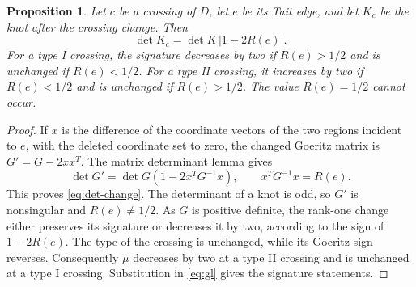 \documentclass[10pt,a4paper]{amsart}
\newtheorem{proposition}{Proposition}
\newcommand{\Reff}{R}
\begin{document}
\begin{proposition}\label{prop:sigma}
Let $c$ be a crossing of $D$, let $e$ be its Tait edge, and let $K_c$ be the knot after
the crossing change. Then
\begin{equation}\label{eq:det-change}
    \det K_c=\det K\,|1-2\Reff(e)|.
\end{equation}
For a type I crossing, the signature decreases by two if $\Reff(e)>1/2$ and is unchanged
if $\Reff(e)<1/2$. For a type II crossing, it increases by two if $\Reff(e)<1/2$ and
is unchanged if $\Reff(e)>1/2$. The value $\Reff(e)=1/2$ cannot occur.
\end{proposition}

\begin{proof}
If $x$ is the difference of the coordinate vectors of the two regions incident to $e$,
with the deleted coordinate set to zero, the changed Goeritz matrix is
$G'=G-2xx^T$. The matrix determinant lemma gives
\[
    \det G'=\det G(1-2x^TG^{-1}x),\qquad x^TG^{-1}x=\Reff(e).
\]
This proves \eqref{eq:det-change}. The determinant of a knot is odd, so $G'$ is
nonsingular and $\Reff(e)\ne1/2$. As $G$ is positive definite, the rank-one change either
preserves its signature or decreases it by two, according to the sign of
$1-2\Reff(e)$. The type of the crossing is unchanged, while its Goeritz sign reverses.
Consequently $\mu$ decreases by two at a type II crossing and is unchanged at a type I
crossing. Substitution in \eqref{eq:gl} gives the signature statements.
\end{proof}
\end{document}
